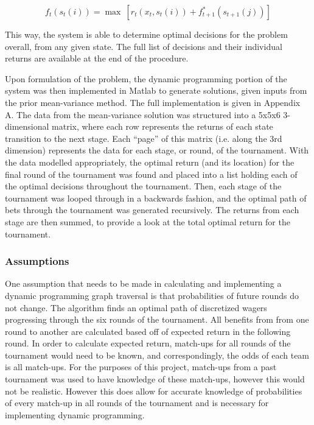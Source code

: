 \documentclass[12pt]{article}
\begin{document}
\begin{equation}
f_{t}(s_{t}(i)) = \max \ [r_{t}(x_{t},s_{t}(i)) + f^{*}_{t+1}(s_{t+1}(j))]
\label{dp_recursive}
\end{equation}

This way, the system is able to determine optimal decisions for the problem overall, from any given state.
The full list of decisions and their individual returns are available at the end of the procedure.

Upon formulation of the problem, the dynamic programming portion of the system was then implemented in Matlab to generate solutions, given inputs from the prior mean-variance method.
The full implementation is given in Appendix A.
The data from the mean-variance solution was structured into a 5x5x6 3-dimensional matrix, where each row represents the returns of each state transition to the next stage.
Each ``page'' of this matrix (i.e. along the 3rd dimension) represents the data for each stage, or round, of the tournament.
With the data modelled appropriately, the optimal return (and its location) for the final round of the tournament was found and placed into a list holding each of the optimal decisions throughout the tournament.
Then, each stage of the tournament was looped through in a backwards fashion, and the optimal path of bets through the tournament was generated recursively.
The returns from each stage are then summed, to provide a look at the total optimal return for the tournament.

\subsubsection{Assumptions}
One assumption that needs to be made in calculating and implementing a dynamic programming graph traversal is that probabilities of future rounds do not change.
The algorithm finds an optimal path of discretized wagers progressing through the six rounds of the tournament. 
All benefits from from one round to another are calculated based off of expected return in the following round.
In order to calculate expected return, match-ups for all rounds of the tournament would need to be known, and correspondingly, the odds of each team is all match-ups. 
For the purposes of this project, match-ups from a past tournament was used to have knowledge of these match-ups, however this would not be realistic.
However this does allow for accurate knowledge of probabilities of every match-up in all rounds of the tournament and is necessary for implementing dynamic programming.
\end{document}
